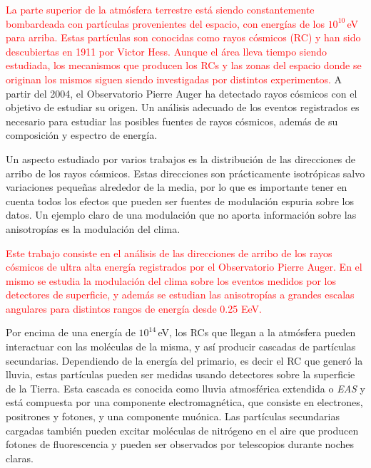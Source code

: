 



\textcolor{red}{La parte superior de la atmósfera terrestre está siendo constantemente bombardeada con partículas provenientes del espacio, con energías de los $10^{10}\,$eV para arriba. Estas partículas son conocidas como rayos cósmicos (RC) y han sido descubiertas en 1911 por Victor Hess. Aunque el área lleva tiempo siendo estudiada, los mecanismos que producen los RCs y las zonas del espacio donde se originan los mismos siguen siendo investigadas por distintos experimentos.}  A partir del 2004, el Observatorio Pierre Auger ha detectado rayos cósmicos con el objetivo de estudiar su origen. Un análisis adecuado de los eventos registrados es necesario para estudiar las posibles fuentes de rayos cósmicos, además de su composición y espectro de energía.

Un aspecto estudiado por varios trabajos \cite{collaboration2013pierre} \cite{data} es la distribución de las direcciones de arribo de los rayos cósmicos. Estas direcciones son prácticamente isotrópicas salvo variaciones pequeñas alrededor de la media, por lo que es importante tener en cuenta todos los efectos que pueden ser fuentes de modulación espuria sobre los datos. Un ejemplo claro de una modulación que no aporta información sobre las anisotropías es la modulación del clima.

\textcolor{red}{Este trabajo consiste en el análisis de las direcciones de arribo de los rayos cósmicos de ultra alta energía registrados por el Observatorio Pierre Auger. En el mismo se estudia la modulación del clima sobre los eventos medidos por los detectores de superficie, y además se estudian las anisotropías a grandes escalas angulares para distintos rangos de energía desde 0.25 EeV.}  %





Por encima de una energía de $10^{14}\,$eV, los RCs que llegan a la atmósfera pueden interactuar con las moléculas de la misma,  y así producir cascadas de partículas secundarias. Dependiendo de la energía del primario, es decir el RC que generó la lluvia, estas partículas pueden ser medidas usando detectores sobre la superficie de la Tierra. Esta cascada es conocida como lluvia atmosférica extendida o \emph{EAS} y está compuesta por una componente electromagnética, que consiste en electrones, positrones y fotones, y una componente muónica. Las partículas secundarias cargadas también pueden excitar moléculas de nitrógeno en el aire que producen fotones de fluorescencia y pueden ser observados por telescopios durante noches claras.


